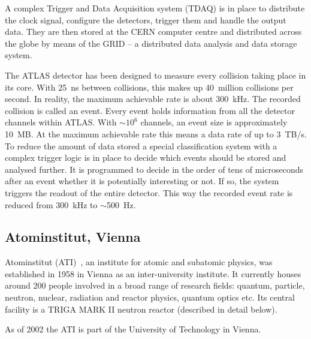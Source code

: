 A complex Trigger and Data Acquisition system (TDAQ) is in place to distribute the clock signal, configure the detectors, trigger them and handle the output data. They are then stored at the CERN computer centre and distributed across the globe by means of the GRID -- a distributed data analysis and data storage system.

The ATLAS detector has been designed to measure every collision taking place in its core. With 25~ns between collisions, this makes up 40~million collisions per second. In reality, the maximum achievable rate is about 300~kHz. The recorded collision is called an event. Every event holds information from all the detector channels within ATLAS. With $\sim$$10^6$ channels, an event size is approximately 10~MB. At the maximum achievable rate this means a data rate of up to 3~TB/s. To reduce the amount of data stored a special classification system with a complex trigger logic is in place to decide which events should be stored and analysed further. It is programmed to decide in the order of tens of microseconds after an event whether it is potentially interesting or not. If so, the system triggers the readout of the entire detector. This way the recorded event rate is reduced from 300~kHz to $\sim$500~Hz.


\subsection{Atominstitut, Vienna}
Atominstitut (ATI)~\cite{AtomInst:00000}, an institute for atomic and subatomic physics, was established in 1958 in Vienna as an inter-university institute. It currently houses around 200 people involved in a broad range of research fields: quantum, particle, neutron, nuclear, radiation and reactor physics, quantum optics etc. Its central facility is a TRIGA MARK II neutron reactor (described in detail below). 

As of 2002 the ATI is part of the University of Technology in Vienna.


